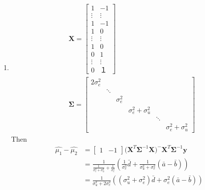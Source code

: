 \documentclass{article}
\begin{document}
\begin{enumerate}[leftmargin = 0 em, label = \arabic*., font = \bfseries]
\begin{enumerate}
			  	 \item 
			  	 \begin{align*}
			  	 & \bm X = \begin{bmatrix}
			  	 	1 & -1\\
			  	 	\vdots & \vdots\\
			  	 	1 & -1\\
			  	 	1 & 0\\
			  	 	\vdots & \vdots\\
			  	 	1 & 0\\
			  	 	0 & 1\\
			  	 	\vdots & \vdots \\
			  	 	0 &１
			  	 \end{bmatrix}\\
			  	 & \bm \Sigma = \begin{bmatrix}
			  	 	2 \sigma_e^2  \\
			  	 	& \ddots\\
			  	 	&& \sigma_e^2 \\
			  	 	&&& \sigma_e^2 + \sigma_u^2 \\
			  	 	&&&& \ddots \\
			  	 	&&&&& \sigma_e^2 + \sigma_u^2
			  	 \end{bmatrix}
			  	 \end{align*}
			  	 Then
			  	 \begin{align*}
			  	 \hat{\mu_1} - \hat{\mu_2} & = \begin{bmatrix}
			  	 	1 & -1
			  	 \end{bmatrix}
			  	 \bm (\bm X^T \bm \Sigma^{-1} \bm X)^- \bm X^T \bm \Sigma^{-1} \bm y \\
			  	 & = \frac{1}{\frac{1}{\sigma_e^2 + \sigma_u^2} + \frac{1}{\sigma_e^2}}\left(\frac{1}{\sigma_e^2} \bar{d} + \frac{1}{\sigma_u^2 + \sigma_e^2} (\bar{a} - \bar{b})\right)\\
			  	 & = \frac{1}{\sigma_{u}^2 + 2 \sigma_e^2} \left( (\sigma_u^2 + \sigma_e^2) \bar{d} + \sigma_e^2 (\bar{a} - \bar{b})\right)
			  	 \end{align*}
			  	 
			  	 
			  \end{enumerate}


\end{enumerate}
\end{document}

